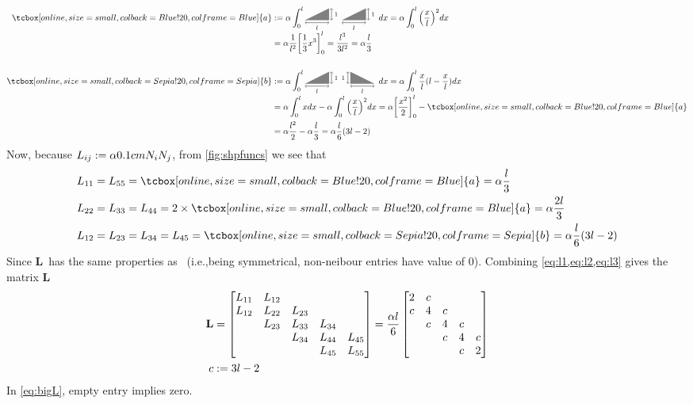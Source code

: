 \newcommand{\il}[1]{\ensuremath{\int_0^l #1 dx}}
\newcommand{\brkIt}[1]{\ensuremath{\left[#1\right]}}
\newcommand{\brkItl}[1]{\ensuremath{{\brkIt{#1}}_0^l}}
\newcommand{\prnIt}[1]{\ensuremath{\left( #1 \right)}}
\def\xl{\ensuremath{{\left( \frac{x}{l} \right)}^2}}
\def\a{\tcbox[on line,size=small,colback=\mycola!20,colframe=\mycola]{a}}
\def\b{\tcbox[on line,size=small,colback=\mycolb!20,colframe=\mycolb]{b}}
\def\anum{\ensuremath{\alpha\frac{l}{3}}}
\def\bnum{\ensuremath{\alpha\frac{l^2}{2} - \anum }}
\def\bnumb{\ensuremath{\alpha\frac{l}{6}(3l-2)}}
\begin{align}
  \a &:= \alpha \il{\Ta \Ta} = \alpha  \il{\xl{}} \notag\\
  &= \alpha \frac{1}{l^2} \brkItl{\frac{1}{3}x^3}
  = \frac{l^3}{3l^2} = \anum \\[\baselineskip]
  \b &:= \alpha \il{\Ta \Tb } = \alpha  \il{\frac{x}{l} (l - \frac{x}{l})} \notag\\
    &= \alpha\il{x} - \alpha \il{\xl{}}
      = \alpha\brkItl{\frac{x^2}{2}} - \a \notag\\
  &= \bnum =  \bnumb
\end{align}
Now, because $L_{ij} := \alpha 0.1cm{N_i N_j}$, from \cref{fig:shpfuncs} we see
that
\begin{align}
  L_{11} &= L_{55} = \a  = \anum \label{eq:l1}\\
  L_{22} &= L_{33} = L_{44} = 2 \times \a = \alpha\frac{2l}{3} \label{eq:l2}\\
  L_{12} &= L_{23} = L_{34} = L_{45} = \b = \bnumb \label{eq:l3}
\end{align}
\def\L{\ensuremath{\mathbf{L}}}
Since \L \ has the same properties as \K \
(i.e.,being symmetrical, non-neibour entries have value of 0).
Combining \cref{eq:l1,eq:l2,eq:l3} gives the matrix \L
\def\x{3l-2}
\begin{align}
  \mathbf{L} &=
               \begin{bmatrix}
                 L_{11} & L_{12} &&&\\
                 L_{12} & L_{22} &L_{23}&&\\
                 & L_{23} &L_{33}&L_{34}&\\
                 &&L_{34}&L_{44}&L_{45}\\
                 &&&L_{45}&L_{55}
               \end{bmatrix}
                            =
                            \frac{\alpha l}{6}
                            \begin{bmatrix}
                              2& c &&&\\
                              c &4&c&&\\
                              & c &4&c&\\
                              &&c&4&c\\
                              &&&c&2
                            \end{bmatrix} \label{eq:bigL}\\
  c &:= \x \notag
\end{align}
In \cref{eq:bigL}, empty entry implies zero.

